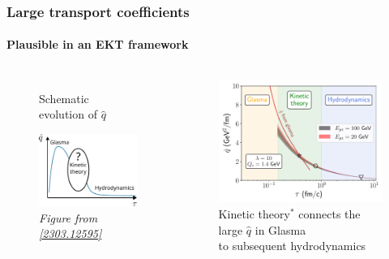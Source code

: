 \documentclass[aspectratio=169,11pt,usenames,dvipsnames]{beamer}
\begin{document}
\begin{frame}
    \frametitle{Large transport coefficients}
    \framesubtitle{Plausible in an EKT framework}
    \vspace{-0.4cm}
    \begin{columns}[onlytextwidth,t]
        \begin{figure}[!hbt]
            \centering
            \captionsetup{justification=centering}
            \caption{Schematic evolution of $\hat{q}$}\vspace{-0.3cm}
            \includegraphics[width=0.8\columnwidth]{images/qhat_schematic_evolution.pdf}\vspace{-0.3cm}
            \caption{\scriptsize\itshape Figure from \href{https://arxiv.org/abs/2303.12595}{\color{ForestGreen}[2303.12595]}}
        \end{figure}
        \begin{figure}[!hbt]
            \centering
            \captionsetup{justification=centering}
            \caption{{\color{ForestGreen}Kinetic theory}$^*$ connects the large $\hat{q}$ in {\color{Dandelion}Glasma}\\ to subsequent {\color{Periwinkle}hydrodynamics}}\vspace{-0.2cm}
            \includegraphics[width=0.8\columnwidth]{images/2023-03-07-16-41-35_qhat_appetizer_glasma_comparison_493.pdf}
        \end{figure}
    \end{columns}   
\end{frame}
\end{document}
